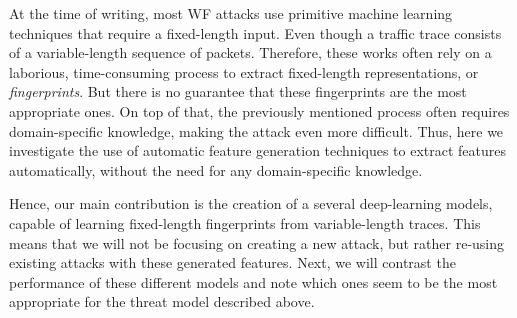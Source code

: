 At the time of writing, most WF attacks use primitive machine learning techniques that require a fixed-length input.
Even though a traffic trace consists of a variable-length sequence of packets.
Therefore, these works often rely on a laborious, time-consuming process to extract fixed-length representations, or \textit{fingerprints}.
But there is no guarantee that these fingerprints are the most appropriate ones.
On top of that, the previously mentioned process often requires domain-specific knowledge, making the attack even more difficult.
Thus, here we investigate the use of automatic feature generation techniques to extract features automatically, without the need for any domain-specific knowledge.

Hence, our main contribution is the creation of a several deep-learning models, capable of learning fixed-length fingerprints from variable-length traces.
This means that we will not be focusing on creating a new attack, but rather re-using existing attacks with these generated features.
Next, we will contrast the performance of these different models and note which ones seem to be the most appropriate for the threat model described above.
